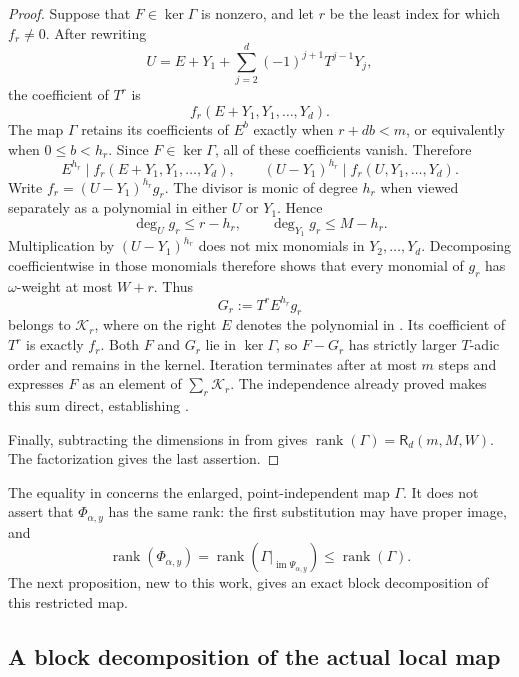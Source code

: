 \documentclass[11pt,letterpaper]{article}
\theoremstyle{definition}
\newcommand{\rank}{\operatorname{rank}}
\begin{document}
\begin{proof}
Suppose that \(F\in\ker\Gamma\) is nonzero, and let \(r\) be the least
index for which \(f_r\ne0\).  After rewriting
\[
  U=E+Y_1+\sum_{j=2}^{d}(-1)^{j+1}T^{j-1}Y_j,
\]
the coefficient of \(T^r\) is
\[
  f_r(E+Y_1,Y_1,\ldots,Y_d).
\]
The map \(\Gamma\) retains its coefficients of \(E^b\) exactly when
\(r+db<m\), or equivalently when \(0\leq b<h_r\).  Since
\(F\in\ker\Gamma\), all of these coefficients vanish.  Therefore
\begin{equation}
  E^{h_r}\mid f_r(E+Y_1,Y_1,\ldots,Y_d),
  \qquad
  (U-Y_1)^{h_r}\mid f_r(U,Y_1,\ldots,Y_d).
  \label{eq:gamma-leading-divisibility}
\end{equation}
Write
\(f_r=(U-Y_1)^{h_r}g_r\).  The divisor is monic of degree \(h_r\)
when viewed separately as a polynomial in either \(U\) or \(Y_1\).
Hence
\[
  \deg_U g_r\leq r-h_r,
  \qquad
  \deg_{Y_1}g_r\leq M-h_r.
\]
Multiplication by \((U-Y_1)^{h_r}\) does not mix monomials in
\(Y_2,\ldots,Y_d\). Decomposing coefficientwise in those monomials
therefore shows that every monomial of \(g_r\) has \(\omega\)-weight at
most \(W+r\). Thus
\[
  G_r:=T^rE^{h_r}g_r
\]
belongs to \(\mathcal K_r\), where on the right \(E\) denotes the
polynomial in .  Its coefficient of \(T^r\) is exactly
\(f_r\).  Both \(F\) and \(G_r\) lie in \(\ker\Gamma\), so
\(F-G_r\) has strictly larger \(T\)-adic order and remains in the kernel.
Iteration terminates after at most \(m\) steps and expresses \(F\) as an
element of \(\sum_r\mathcal K_r\).  The independence already proved makes
this sum direct, establishing .

Finally, subtracting the dimensions in  from
 gives
\(\rank(\Gamma)=\mathsf R_d(m,M,W)\).  The factorization
 gives the last assertion.
\end{proof}

The equality in  concerns the enlarged,
point-independent map \(\Gamma\).  It does not assert that
\(\Phi_{\alpha,y}\) has the same rank: the first substitution may have
proper image, and
\[
  \rank(\Phi_{\alpha,y})
  =\rank\!\left(\Gamma\big|_{\operatorname{im}\Psi_{\alpha,y}}\right)
  \leq\rank(\Gamma).
\]
The next proposition, new to this work, gives an exact block decomposition of
this restricted map.

\subsection{A block decomposition of the actual local map}
\end{document}
